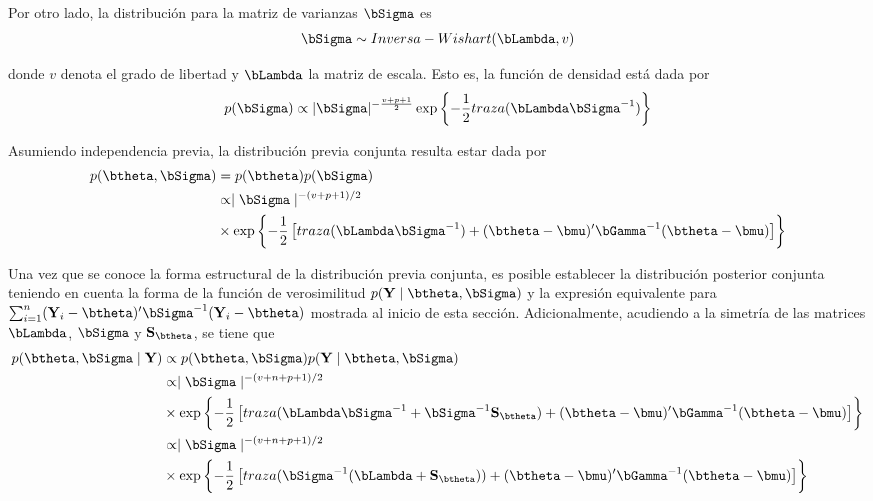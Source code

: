\documentclass[10pt,openright]{book}\usepackage[]{graphicx}\usepackage[]{color}
\begin{document}
Por otro lado, la distribuci\'on para la matriz de varianzas $\bSigma$ es
\begin{equation*}
\bSigma \sim Inversa-Wishart(\bLambda,v)
\end{equation*}

donde $v$ denota el grado de libertad y $\bLambda$ la matriz de escala. Esto es, la funci\'on de densidad est\'a dada por
\begin{equation*}
p(\bSigma)\propto |\bSigma|^{-\frac{v+p+1}{2}}\exp\left\{-\frac{1}{2}traza(\bLambda\bSigma^{-1})\right\}
\end{equation*}

Asumiendo independencia previa, la distribuci\'on previa conjunta resulta estar dada por
\begin{align}
p(\btheta,\bSigma)&=p(\btheta)p(\bSigma)\notag\\
&\propto \mid \bSigma \mid ^{-(v+p+1)/2}\notag\\
&\times
\exp\left\{ -\frac{1}{2}\left[traza(\bLambda\bSigma^{-1})+
(\btheta-\bmu)'\bGamma^{-1}(\btheta-\bmu)\right]\right\}
\end{align}


Una vez que se conoce la forma estructural de la distribuci\'on previa conjunta, es posible establecer la distribuci\'on posterior conjunta teniendo en cuenta la forma de la funci\'on de verosimilitud $p(\mathbf{Y} \mid \btheta,\bSigma)$ y la expresi\'on equivalente para $\sum_{i=1}^n(\mathbf{Y}_i-\btheta)'\bSigma^{-1}(\mathbf{Y}_i-\btheta)$ mostrada al inicio de esta secci\'on. Adicionalmente, acudiendo a la simetr\'ia de las matrices $\bLambda$, $\bSigma$ y $\mathbf{S}_{\btheta}$, se tiene que
\begin{align}
p(\btheta,\bSigma \mid \mathbf{Y})&\propto p(\btheta,\bSigma)p(\mathbf{Y} \mid \btheta,\bSigma)\notag\\
&\propto \mid \bSigma \mid ^{-(v+n+p+1)/2}\notag\\
&\times
\exp\left\{ -\frac{1}{2}\left[traza(\bLambda\bSigma^{-1}+\bSigma^{-1}\mathbf{S}_{\btheta})+
                                (\btheta-\bmu)'\bGamma^{-1}(\btheta-\bmu)\right]\right\}\notag\\
                              &\propto \mid \bSigma \mid ^{-(v+n+p+1)/2}\notag\\
                              &\times
                              \exp\left\{ -\frac{1}{2}\left[traza(\bSigma^{-1}(\bLambda+\mathbf{S}_{\btheta}))+
                              (\btheta-\bmu)'\bGamma^{-1}(\btheta-\bmu)\right]\right\}
\end{align}
\end{document}
